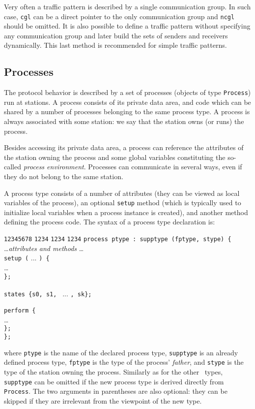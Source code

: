 Very often a traffic pattern is described by a single communication group.
In such case, {\tt cgl} can be a direct pointer to the only
communication group and {\tt ncgl} should be omitted.
It is also possible to define a traffic pattern without specifying any
communication group and later build the sets of senders and
receivers dynamically.
This last method is recommended for simple traffic patterns.

\subsection{Processes}

The protocol behavior is described by a set of processes (objects of type
{\tt Process}) run at stations.
A process consists of its private data area, and code which can be shared
by a number of processes belonging to the same process type.
A process is always associated with some station: we say that the station
owns (or runs) the process.

Besides accessing its private data area, a process can reference the
attributes of the station owning the process and some global variables
constituting the so-called {\em process environment}.
Processes can communicate in several ways, even if they do not belong to
the same station.

A process type consists of a number of attributes (they can be viewed as
local variables of the process), an optional {\tt setup} method (which is
typically used to initialize local variables when a process instance is
created), and another method defining the process code.
The syntax of a process type declaration is:
{\small
\begin{tabbing}
{\tt 12345678} \= {\tt 1234} \= {\tt 1234} \= {\tt 1234} \kill
\> {\tt process ptype : supptype (fptype, stype) \{} \\
\> \> \ldots {\em attributes and methods} \ldots \\
\> \> {\tt setup (} ... {\tt ) \{} \\
\> \> \> \ldots \\
\> \> {\tt \};} \\
\> {\tt ~} \\
\> \> {\tt states \{s0, s1, } ... {\tt , sk\};} \\
\> {\tt ~} \\
\> \> {\tt perform \{} \\
\> \> \> \ldots \\
\> \> {\tt \};} \\
\> {\tt \};}
\end{tabbing} }
\noindent
where {\tt ptype} is the name of the declared process type,
{\tt supptype} is an already defined process type,
{\tt fptype} is the type of the process' {\em father}, and
{\tt stype} is the type of the station owning the process.
Similarly as for the other \smurph\ types, {\tt supptype} can be omitted
if the new process type is derived directly from {\tt Process}.
The two arguments in parentheses are also optional: they can be skipped
if they are irrelevant from the viewpoint of the new type.

